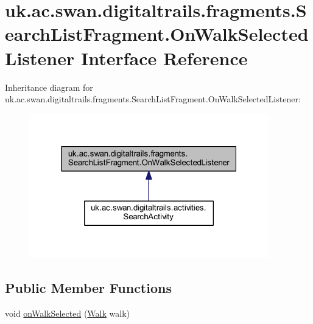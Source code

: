 \hypertarget{interfaceuk_1_1ac_1_1swan_1_1digitaltrails_1_1fragments_1_1_search_list_fragment_1_1_on_walk_selected_listener}{\section{uk.\+ac.\+swan.\+digitaltrails.\+fragments.\+Search\+List\+Fragment.\+On\+Walk\+Selected\+Listener Interface Reference}
\label{interfaceuk_1_1ac_1_1swan_1_1digitaltrails_1_1fragments_1_1_search_list_fragment_1_1_on_walk_selected_listener}
}


Inheritance diagram for uk.\+ac.\+swan.\+digitaltrails.\+fragments.\+Search\+List\+Fragment.\+On\+Walk\+Selected\+Listener\+:\nopagebreak
\begin{figure}[H]
\begin{center}
\leavevmode
\includegraphics[width=295pt]{interfaceuk_1_1ac_1_1swan_1_1digitaltrails_1_1fragments_1_1_search_list_fragment_1_1_on_walk_selected_listener__inherit__graph}
\end{center}
\end{figure}
\subsection*{Public Member Functions}
\begin{DoxyCompactItemize}
\item 
void \hyperlink{interfaceuk_1_1ac_1_1swan_1_1digitaltrails_1_1fragments_1_1_search_list_fragment_1_1_on_walk_selected_listener_a409108bc8754bafbf33e6b4fae4dad4d}{on\+Walk\+Selected} (\hyperlink{classuk_1_1ac_1_1swan_1_1digitaltrails_1_1components_1_1_walk}{Walk} walk)
\end{DoxyCompactItemize}


